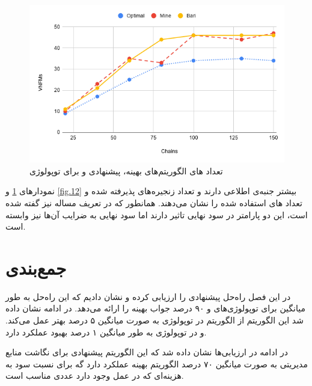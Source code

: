 \begin{figure}[h!]
\center\includegraphics[scale=.5]{images/chart-8}
\caption{تعداد های الگوریتم‌های بهینه، پیشنهادی و \cite{Bari2015} برای توپولوژی }
\label{fig.13}
\end{figure}

نمودارهای \ref{fig.13} و \ref{fig.12}
بیشتر جنبه‌ی اطلاعی دارند و تعداد زنجیره‌های پذیرفته شده و تعداد
های
استفاده شده را نشان می‌دهند.
همانطور که در تعریف مساله نیز گفته شده است، این دو پارامتر در سود نهایی تاثیر دارند
اما سود نهایی به ضرایب آن‌ها نیز وابسته است.

\section{جمع‌بندی}
در این فصل راه‌حل پیشنهادی را ارزیابی کرده و نشان دادیم
که این راه‌حل به طور میانگین برای توپولوژی‌های  و 
۹۰ درصد جواب بهینه را ارائه می‌دهد.
در ادامه نشان داده شد این الگوریتم از الگوریتم \cite{Bari2015}
در توپولوژی 
به صورت میانگین ۵ درصد بهتر عمل می‌کند.
و در توپولوژی 
به طور میانگین ۱ درصد بهبود عملکرد دارد.

در ادامه در ارزیابی‌ها نشان داده شد که این الگوریتم پیشنهادی برای نگاشت منابع مدیریتی
به صورت میانگین ۷۰ درصد الگوریتم بهینه عملکرد دارد
گه برای نسبت سود به هزینه‌ای که در عمل وجود دارد عددی مناسب است.